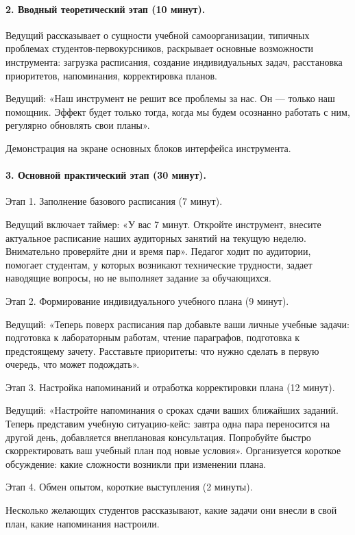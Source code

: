 \documentclass[14pt,a4paper]{article}
\begin{document}
\paragraph{2. Вводный теоретический этап (10 минут).}
Ведущий рассказывает о сущности учебной самоорганизации, типичных проблемах студентов‑первокурсников, раскрывает основные возможности инструмента: загрузка расписания, создание индивидуальных задач, расстановка приоритетов, напоминания, корректировка планов.

Ведущий: «Наш инструмент не решит все проблемы за нас. Он — только наш помощник. Эффект будет только тогда, когда мы будем осознанно работать с ним, регулярно обновлять свои планы».

Демонстрация на экране основных блоков интерфейса инструмента.

\paragraph{3. Основной практический этап (30 минут).}

Этап 1. Заполнение базового расписания (7 минут).

Ведущий включает таймер: «У вас 7 минут. Откройте инструмент, внесите актуальное расписание наших аудиторных занятий на текущую неделю. Внимательно проверяйте дни и время пар». Педагог ходит по аудитории, помогает студентам, у которых возникают технические трудности, задает наводящие вопросы, но не выполняет задание за обучающихся.

Этап 2. Формирование индивидуального учебного плана (9 минут).

Ведущий: «Теперь поверх расписания пар добавьте ваши личные учебные задачи: подготовка к лабораторным работам, чтение параграфов, подготовка к предстоящему зачету. Расставьте приоритеты: что нужно сделать в первую очередь, что может подождать».

Этап 3. Настройка напоминаний и отработка корректировки плана (12 минут).

Ведущий: «Настройте напоминания о сроках сдачи ваших ближайших заданий. Теперь представим учебную ситуацию‑кейс: завтра одна пара переносится на другой день, добавляется внеплановая консультация. Попробуйте быстро скорректировать ваш учебный план под новые условия». Организуется короткое обсуждение: какие сложности возникли при изменении плана.

Этап 4. Обмен опытом, короткие выступления (2 минуты).

Несколько желающих студентов рассказывают, какие задачи они внесли в свой план, какие напоминания настроили.
\end{document}
